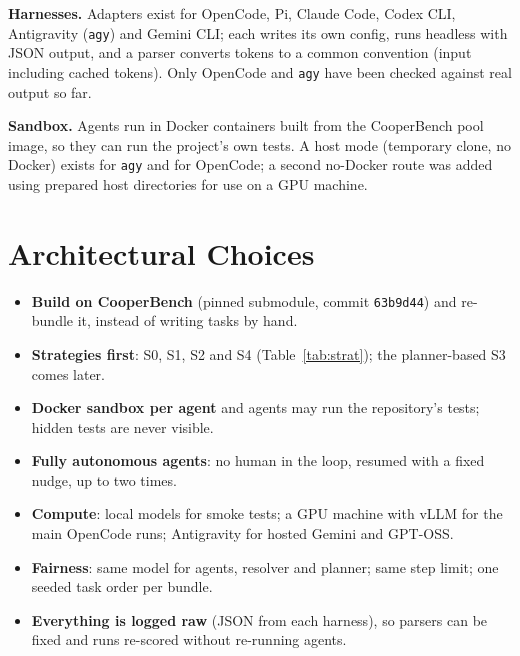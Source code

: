\documentclass[sigconf,nonacm]{acmart}
\begin{document}
\textbf{Harnesses.} Adapters exist for OpenCode, Pi, Claude Code, Codex CLI, Antigravity (\texttt{agy}) and Gemini CLI; each writes its own config, runs headless with JSON output, and a parser converts tokens to a common convention (input including cached tokens). Only OpenCode and \texttt{agy} have been checked against real output so far.

\textbf{Sandbox.} Agents run in Docker containers built from the CooperBench pool image, so they can run the project's own tests. A host mode (temporary clone, no Docker) exists for \texttt{agy} and for OpenCode; a second no-Docker route was added using prepared host directories for use on a GPU machine.

\section{Architectural Choices}
\begin{itemize}\itemsep0pt
\item \textbf{Build on CooperBench} (pinned submodule, commit \texttt{63b9d44}) and re-bundle it, instead of writing tasks by hand.
\item \textbf{Strategies first}: S0, S1, S2 and S4 (Table~\ref{tab:strat}); the planner-based S3 comes later.
\item \textbf{Docker sandbox per agent} and agents may run the repository's tests; hidden tests are never visible.
\item \textbf{Fully autonomous agents}: no human in the loop, resumed with a fixed nudge, up to two times.
\item \textbf{Compute}: local models for smoke tests; a GPU machine with vLLM for the main OpenCode runs; Antigravity for hosted Gemini and GPT-OSS.
\item \textbf{Fairness}: same model for agents, resolver and planner; same step limit; one seeded task order per bundle.
\item \textbf{Everything is logged raw} (JSON from each harness), so parsers can be fixed and runs re-scored without re-running agents.
\end{itemize}
\end{document}
